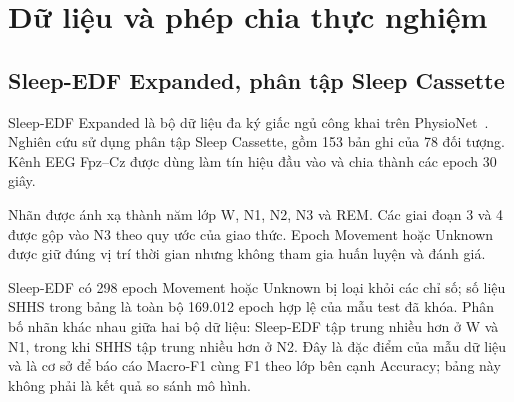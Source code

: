 \section{Dữ liệu và phép chia thực nghiệm}
\label{sec:dataset}

\subsection{Sleep-EDF Expanded, phân tập Sleep Cassette}

Sleep-EDF Expanded là bộ dữ liệu đa ký giấc ngủ công khai trên PhysioNet~\cite{kemp2000sleepEDF,physionetSleepEDF}. Nghiên cứu sử dụng phân tập Sleep Cassette, gồm 153 bản ghi của 78 đối tượng. Kênh EEG Fpz--Cz được dùng làm tín hiệu đầu vào và chia thành các epoch 30 giây.

Nhãn được ánh xạ thành năm lớp W, N1, N2, N3 và REM. Các giai đoạn 3 và 4 được gộp vào N3 theo quy ước của giao thức. Epoch Movement hoặc Unknown được giữ đúng vị trí thời gian nhưng không tham gia huấn luyện và đánh giá.

\begin{table}[H]
\centering
\caption{Phân bố nhãn hợp lệ trên Sleep-EDF và mẫu SHHS1 test}
\label{tab:label_distribution}
\end{table}

Sleep-EDF có 298 epoch Movement hoặc Unknown bị loại khỏi các chỉ số; số liệu SHHS trong bảng là toàn bộ 169.012 epoch hợp lệ của mẫu test đã khóa. Phân bố nhãn khác nhau giữa hai bộ dữ liệu: Sleep-EDF tập trung nhiều hơn ở W và N1, trong khi SHHS tập trung nhiều hơn ở N2. Đây là đặc điểm của mẫu dữ liệu và là cơ sở để báo cáo Macro-F1 cùng F1 theo lớp bên cạnh Accuracy; bảng này không phải là kết quả so sánh mô hình.

